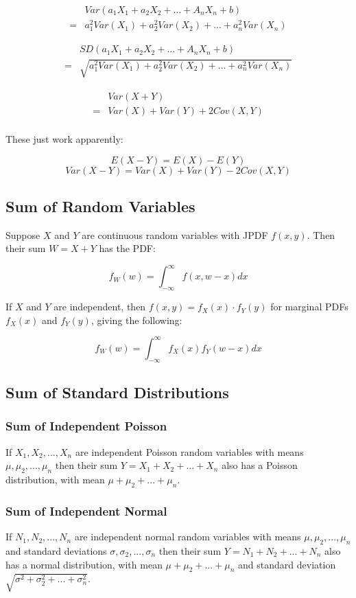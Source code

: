 \begin{align*}
      & Var(a_1X_1+a_2X_2+...+A_nX_n+b)                  \\
    = & a_1^2 Var(X_1)+a_2^2 Var(X_2)+...+a_n^2 Var(X_n)
\end{align*}

\begin{align*}
      & SD(a_1X_1+a_2X_2+...+A_nX_n+b)                          \\
    = & \sqrt{a_1^2 Var(X_1)+a_2^2 Var(X_2)+...+a_n^2 Var(X_n)}
\end{align*}

\begin{align*}
      & Var(X+Y)                \\
    = & Var(X)+Var(Y)+2Cov(X,Y) \\
\end{align*}

These just work apparently:

$$ E(X-Y) = E(X)-E(Y) $$
$$ Var(X-Y) = Var(X)+Var(Y)-2Cov(X,Y) $$

\subsection{Sum of Random Variables}

Suppose $X$ and $Y$ are continuous random variables with JPDF $f(x,y)$. Then their sum $W=X+Y$ has the PDF:

$$ f_W(w) = \int_{-\infty}^{\infty} f(x,w-x) dx $$

If $X$ and $Y$ are independent, then $f(x,y) = f_X(x)\cdot f_Y(y)$ for marginal PDFs $f_X(x)$ and $f_Y(y)$, giving the following:

$$ f_W(w) = \int_{-\infty}^{\infty} f_X(x) f_Y(w-x) dx $$

\subsection{Sum of Standard Distributions}

\subsubsection{Sum of Independent Poisson}

If $X_1,X_2,...,X_n$ are independent Poisson random variables with means $\mu,\mu_2,...,\mu_n$ then their sum $Y=X_1+X_2+...+X_n$ also has a Poisson distribution, with mean $\mu+\mu_2+...+\mu_n$.

\subsubsection{Sum of Independent Normal}

If $N_1,N_2,...,N_n$ are independent normal random variables with means $\mu,\mu_2,...,\mu_n$ and standard deviations $\sigma,\sigma_2,...,\sigma_n$ then their sum $Y=N_1+N_2+...+N_n$ also has a normal distribution, with mean $\mu+\mu_2+...+\mu_n$ and standard deviation $\sqrt{\sigma^2+\sigma_2^2+...+\sigma_n^2}$.

